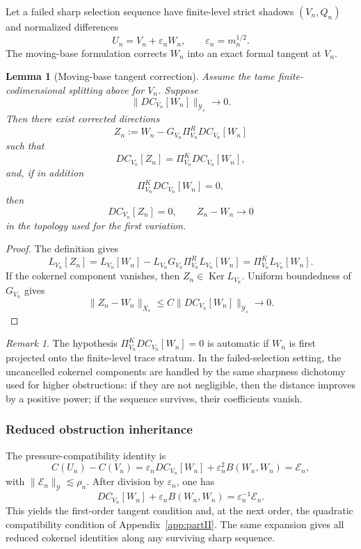 \documentclass[11pt]{article}
\numberwithin{equation}{section}
\theoremstyle{plain}
\newtheorem{lemma}{Lemma}[section]
\theoremstyle{definition}
\theoremstyle{remark}
\newtheorem{remark}{Remark}[section]
\DeclareMathOperator{\Ker}{Ker}
\newcommand{\calE}{\mathcal E}
\newcommand{\calY}{\mathcal Y}
\begin{document}
Let a failed sharp selection sequence have finite-level strict shadows \((V_n,Q_n)\) and normalized
differences
\[
        U_n=V_n+\varepsilon_nW_n,
        \qquad
        \varepsilon_n=m_n^{1/2}.
\]
The moving-base formulation corrects \(W_n\) into an exact formal tangent at \(V_n\).

\begin{lemma}[Moving-base tangent correction]
\label{pIII:lem:moving-base-tangent-correction}
Assume the tame finite-codimensional splitting above for \(V_n\).  Suppose
\[
        \|DC_{V_n}[W_n]\|_{\calY_s}\to0.
\]
Then there exist corrected directions
\[
        Z_n:=W_n-G_{V_n}\Pi_{V_n}^R DC_{V_n}[W_n]
\]
such that
\[
        DC_{V_n}[Z_n]=\Pi_{V_n}^KDC_{V_n}[W_n],
\]
and, if in addition
\[
        \Pi_{V_n}^KDC_{V_n}[W_n]=0,
\]
then
\[
        DC_{V_n}[Z_n]=0,
        \qquad
        Z_n-W_n\to0
\]
in the topology used for the first variation.
\end{lemma}

\begin{proof}
The definition gives
\[
        L_{V_n}[Z_n]
        =L_{V_n}[W_n]-L_{V_n}G_{V_n}\Pi_{V_n}^R L_{V_n}[W_n]
        =\Pi_{V_n}^K L_{V_n}[W_n].
\]
If the cokernel component vanishes, then \(Z_n\in\Ker L_{V_n}\).  Uniform boundedness of
\(G_{V_n}\) gives
\[
        \|Z_n-W_n\|_{X_s}
        \le C\|DC_{V_n}[W_n]\|_{\calY_s}\to0.
\]
\end{proof}

\begin{remark}
The hypothesis \(\Pi_{V_n}^KDC_{V_n}[W_n]=0\) is automatic if \(W_n\) is first projected onto the
finite-level trace stratum.  In the failed-selection setting, the uncancelled cokernel components are
handled by the same sharpness dichotomy used for higher obstructions: if they are not negligible,
then the distance improves by a positive power; if the sequence survives, their coefficients vanish.
\end{remark}

\subsubsection{Reduced obstruction inheritance}

The pressure-compatibility identity is
\[
        C(U_n)-C(V_n)
        =\varepsilon_nDC_{V_n}[W_n]+\varepsilon_n^2B(W_n,W_n)=\calE_n,
\]
with \(\|\calE_n\|_{\calY}\lesssim\rho_n\).  After division by \(\varepsilon_n\), one has
\[
        DC_{V_n}[W_n]+\varepsilon_nB(W_n,W_n)=\varepsilon_n^{-1}\calE_n.
\]
This yields the first-order tangent condition and, at the next order, the quadratic compatibility
condition of Appendix~\ref{app:partII}.  The same expansion gives all reduced cokernel identities along any surviving
sharp sequence.
\end{document}
